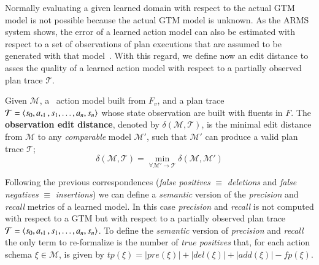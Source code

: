 Normally evaluating a given learned domain with respect to the actual GTM model is not possible because the actual GTM model is unknown. As the ARMS system shows, the error of a learned action model can also be estimated with respect to a set of observations of plan executions that are assumed to be generated with that model~\cite{yang2007learning}. With this regard, we define now an edit distance to asses the quality of a learned action model with respect to a partially observed plan trace $\mathcal{T}$. 

\begin{mydefinition}
  Given $\mathcal{M}$, a \strips\ action model built from $F_v$, and a plan trace $\mathcal{T}={\langle s_0,a,_1,s_1,\ldots,a_n,s_{n} \rangle}$ whose state observation are built with fluents in $F$. The {\bf observation edit distance}, denoted by  $\delta(\mathcal{M},\mathcal{T})$, is the minimal edit distance from $\mathcal{M}$ to any {\em comparable} model $\mathcal{M}'$, such that $\mathcal{M}'$ can produce a valid plan trace $\mathcal{T}$; \[\delta(\mathcal{M},\mathcal{T})=\min_{\forall \mathcal{M}' \rightarrow \mathcal{T}} \delta(\mathcal{M},\mathcal{M}')\]
\end{mydefinition}

Following the previous correspondences ({\em false positives} $\equiv$ {\em deletions} and {\em false negatives} $\equiv$ {\em insertions}) we can define a {\em semantic} version of the {\em precision} and {\em recall} metrics of a learned model. In this case {\em precision} and {\em recall} is not computed with respect to a GTM but with respect to a partially observed plan trace $\mathcal{T}={\langle s_0,a,_1,s_1,\ldots,a_n,s_{n} \rangle}$. To define the {\em semantic} version of {\em precision} and {\em recall} the only term to re-formalize is the number of {\em true positives} that, for each action schema $\xi\in\mathcal{M}$, is given by $tp(\xi)=|pre(\xi)|+|del(\xi)|+|add(\xi)|-fp(\xi)$.


